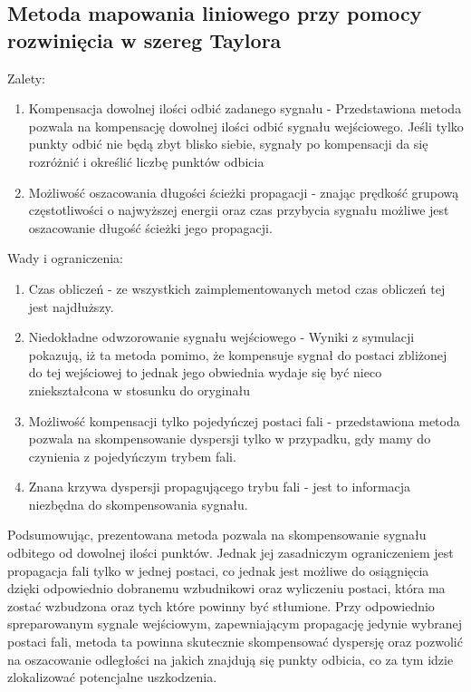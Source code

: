 \subsection{Metoda mapowania liniowego przy pomocy rozwinięcia w szereg Taylora}
Zalety:
\begin{enumerate}
\item Kompensacja dowolnej ilości odbić zadanego sygnału - Przedstawiona metoda pozwala na kompensację dowolnej ilości odbić sygnału wejściowego. Jeśli tylko punkty odbić nie będą zbyt blisko siebie, sygnały po kompensacji da się rozróżnić i określić liczbę punktów odbicia
\item Możliwość oszacowania długości ścieżki propagacji - znając prędkość grupową częstotliwości o najwyższej energii oraz czas przybycia sygnału możliwe jest oszacowanie długość ścieżki jego propagacji.
\end{enumerate}
Wady i ograniczenia:
\begin{enumerate}
\item Czas obliczeń - ze wszystkich zaimplementowanych metod czas obliczeń tej jest najdłuższy.
\item Niedokładne odwzorowanie sygnału wejściowego - Wyniki z symulacji pokazują, iż ta metoda pomimo, że kompensuje sygnał do postaci zbliżonej do tej wejściowej to jednak jego obwiednia wydaje się być nieco zniekształcona w stosunku do oryginału
\item Możliwość kompensacji tylko pojedyńczej postaci fali - przedstawiona metoda pozwala na skompensowanie dyspersji tylko w przypadku, gdy mamy do czynienia z pojedyńczym trybem fali.
\item Znana krzywa dyspersji propagującego trybu fali - jest to informacja niezbędna do skompensowania sygnału.
\end{enumerate}
Podsumowując, prezentowana metoda pozwala na skompensowanie sygnału odbitego od dowolnej ilości punktów. Jednak jej zasadniczym ograniczeniem jest propagacja fali tylko w jednej postaci, co jednak jest możliwe do osiągnięcia dzięki odpowiednio dobranemu wzbudnikowi oraz wyliczeniu postaci, która ma zostać wzbudzona oraz tych które powinny być stłumione. Przy odpowiednio spreparowanym sygnale wejściowym, zapewniającym propagację jedynie wybranej postaci fali, metoda ta powinna skutecznie skompensować dyspersję oraz pozwolić na oszacowanie odległości na jakich znajdują się punkty odbicia, co za tym idzie zlokalizować potencjalne uszkodzenia.
